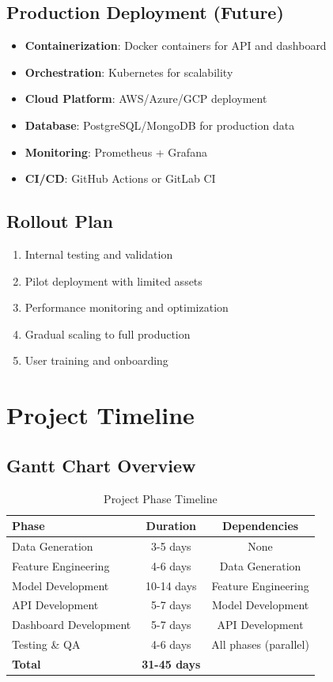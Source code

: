 \documentclass[12pt,a4paper]{article}
\begin{document}
\subsection{Production Deployment (Future)}
\begin{itemize}[leftmargin=*]
    \item \textbf{Containerization}: Docker containers for API and dashboard
    \item \textbf{Orchestration}: Kubernetes for scalability
    \item \textbf{Cloud Platform}: AWS/Azure/GCP deployment
    \item \textbf{Database}: PostgreSQL/MongoDB for production data
    \item \textbf{Monitoring}: Prometheus + Grafana
    \item \textbf{CI/CD}: GitHub Actions or GitLab CI
\end{itemize}

\subsection{Rollout Plan}
\begin{enumerate}
    \item Internal testing and validation
    \item Pilot deployment with limited assets
    \item Performance monitoring and optimization
    \item Gradual scaling to full production
    \item User training and onboarding
\end{enumerate}

\newpage

\section{Project Timeline}

\subsection{Gantt Chart Overview}

\begin{table}[h]
\centering
\begin{tabular}{|l|c|c|}
\hline
\textbf{Phase} & \textbf{Duration} & \textbf{Dependencies} \\
\hline
Data Generation & 3-5 days & None \\
\hline
Feature Engineering & 4-6 days & Data Generation \\
\hline
Model Development & 10-14 days & Feature Engineering \\
\hline
API Development & 5-7 days & Model Development \\
\hline
Dashboard Development & 5-7 days & API Development \\
\hline
Testing \& QA & 4-6 days & All phases (parallel) \\
\hline
\textbf{Total} & \textbf{31-45 days} & \\
\hline
\end{tabular}
\caption{Project Phase Timeline}
\end{table}
\end{document}
